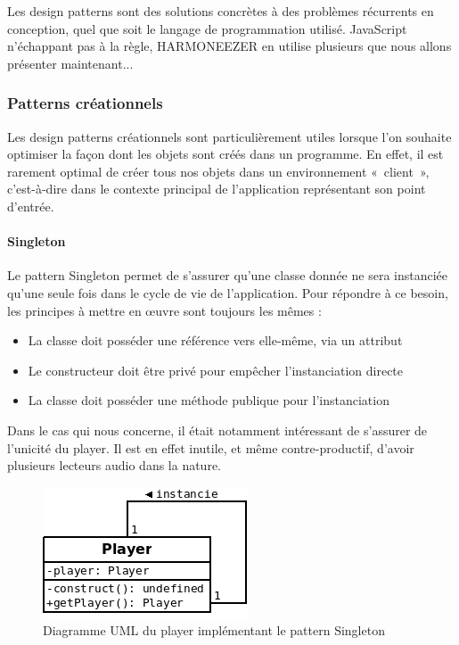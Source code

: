 \documentclass[a4paper,12pt]{article}
\begin{document}
Les design patterns sont des solutions concrètes à des problèmes récurrents en conception, quel que soit le langage de programmation utilisé. JavaScript n'échappant pas à la règle, HARMONEEZER en utilise plusieurs que nous allons présenter maintenant...

\subsubsection{Patterns créationnels}

Les design patterns créationnels sont particulièrement utiles lorsque l'on souhaite optimiser la façon dont les objets sont créés dans un programme. En effet, il est rarement optimal de créer tous nos objets dans un environnement «~client~», c'est-à-dire dans le contexte principal de l'application représentant son point d'entrée.

\paragraph{Singleton}

Le pattern Singleton permet de s'assurer qu'une classe donnée ne sera instanciée qu'une seule fois dans le cycle de vie de l'application. Pour répondre à ce besoin, les principes à mettre en œuvre sont toujours les mêmes :

\begin{itemize}
 \item{La classe doit posséder une référence vers elle-même, via un attribut}
 \item{Le constructeur doit être privé pour empêcher l'instanciation directe}
 \item{La classe doit posséder une méthode publique pour l'instanciation}
\end{itemize}

Dans le cas qui nous concerne, il était notamment intéressant de s'assurer de l'unicité du player. Il est en effet inutile, et même contre-productif, d'avoir plusieurs lecteurs audio dans la nature.

\begin{figure}[!h]
  \begin{center}
    \includegraphics[scale=0.5]{Singleton.png}
    \caption{Diagramme UML du player implémentant le pattern Singleton}
  \end{center}
\end{figure}
\end{document}
